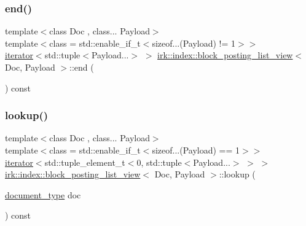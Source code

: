 \mbox{\label{classirk_1_1index_1_1block__posting__list__view_a4d6077530158675e55238d8b506bd86b}} 
\subsubsection{\texorpdfstring{end()}{end()}\hspace{0.1cm}{\footnotesize\ttfamily [2/2]}}
{\footnotesize\ttfamily template$<$class Doc , class... Payload$>$ \\
template$<$class  = std\+::enable\+\_\+if\+\_\+t$<$sizeof...(\+Payload) != 1$>$$>$ \\
\mbox{\hyperlink{classirk_1_1index_1_1block__posting__list__view_1_1iterator}{iterator}}$<$std\+::tuple$<$Payload...$>$ $>$ \mbox{\hyperlink{classirk_1_1index_1_1block__posting__list__view}{irk\+::index\+::block\+\_\+posting\+\_\+list\+\_\+view}}$<$ Doc, Payload $>$\+::end (\begin{DoxyParamCaption}{ }\end{DoxyParamCaption}) const\hspace{0.3cm}{\ttfamily [inline]}}

\mbox{\label{classirk_1_1index_1_1block__posting__list__view_a0b62cb7c0c729c187b6591ba6a667721}} 
\subsubsection{\texorpdfstring{lookup()}{lookup()}\hspace{0.1cm}{\footnotesize\ttfamily [1/2]}}
{\footnotesize\ttfamily template$<$class Doc , class... Payload$>$ \\
template$<$class  = std\+::enable\+\_\+if\+\_\+t$<$sizeof...(\+Payload) == 1$>$$>$ \\
\mbox{\hyperlink{classirk_1_1index_1_1block__posting__list__view_1_1iterator}{iterator}}$<$std\+::tuple\+\_\+element\+\_\+t$<$0, std\+::tuple$<$Payload...$>$ $>$ $>$ \mbox{\hyperlink{classirk_1_1index_1_1block__posting__list__view}{irk\+::index\+::block\+\_\+posting\+\_\+list\+\_\+view}}$<$ Doc, Payload $>$\+::lookup (\begin{DoxyParamCaption}\item[{\mbox{\hyperlink{classirk_1_1index_1_1block__posting__list__view_a4a778116d22c9cf347f38da132ca0900}{document\+\_\+type}}}]{doc }\end{DoxyParamCaption}) const\hspace{0.3cm}{\ttfamily [inline]}}

